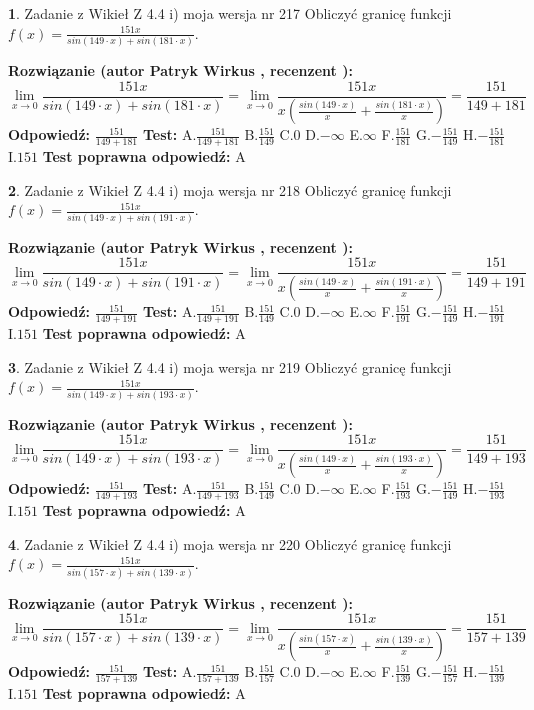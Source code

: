 \documentclass[12pt, a4paper]{article}
\theoremstyle{definition} %
\newtheorem{zad}{}
\newcommand{\zadStart}[1]{\begin{zad}#1\newline}
\newcommand{\zadStop}{\end{zad}}
\newcommand{\rozwStart}[2]{\noindent \textbf{Rozwiązanie (autor #1 , recenzent #2): }\newline}
\newcommand{\rozwStop}{\newline}
\newcommand{\odpStart}{\noindent \textbf{Odpowiedź:}\newline}
\newcommand{\odpStop}{\newline}
\newcommand{\testStart}{\noindent \textbf{Test:}\newline}
\newcommand{\testStop}{\newline}
\newcommand{\kluczStart}{\noindent \textbf{Test poprawna odpowiedź:}\newline}
\newcommand{\kluczStop}{\newline}
\begin{document}
\zadStart{Zadanie z Wikieł Z 4.4 i) moja wersja nr 217}
Obliczyć granicę funkcji $f(x)=\frac{151x}{sin(149\cdot x) +sin(181\cdot x)}$.
\zadStop
\rozwStart{Patryk Wirkus}{}
$$\lim\limits_{x\to 0}\frac{151x}{sin(149\cdot x) +sin(181\cdot x)}=\lim\limits_{x\to 0}\frac{151x}{x(\frac{sin(149\cdot x)}{x}+\frac{sin(181\cdot x)}{x})}=\frac{151}{149+181}$$
\rozwStop
\odpStart
$\frac{151}{149+181}$
\odpStop
\testStart
A.$\frac{151}{149+181}$
B.$\frac{151}{149}$
C.$0$
D.$-\infty$
E.$\infty$
F.$\frac{151}{181}$
G.$-\frac{151}{149}$
H.$-\frac{151}{181}$
I.$151$
\testStop
\kluczStart
A
\kluczStop



\zadStart{Zadanie z Wikieł Z 4.4 i) moja wersja nr 218}
Obliczyć granicę funkcji $f(x)=\frac{151x}{sin(149\cdot x) +sin(191\cdot x)}$.
\zadStop
\rozwStart{Patryk Wirkus}{}
$$\lim\limits_{x\to 0}\frac{151x}{sin(149\cdot x) +sin(191\cdot x)}=\lim\limits_{x\to 0}\frac{151x}{x(\frac{sin(149\cdot x)}{x}+\frac{sin(191\cdot x)}{x})}=\frac{151}{149+191}$$
\rozwStop
\odpStart
$\frac{151}{149+191}$
\odpStop
\testStart
A.$\frac{151}{149+191}$
B.$\frac{151}{149}$
C.$0$
D.$-\infty$
E.$\infty$
F.$\frac{151}{191}$
G.$-\frac{151}{149}$
H.$-\frac{151}{191}$
I.$151$
\testStop
\kluczStart
A
\kluczStop



\zadStart{Zadanie z Wikieł Z 4.4 i) moja wersja nr 219}
Obliczyć granicę funkcji $f(x)=\frac{151x}{sin(149\cdot x) +sin(193\cdot x)}$.
\zadStop
\rozwStart{Patryk Wirkus}{}
$$\lim\limits_{x\to 0}\frac{151x}{sin(149\cdot x) +sin(193\cdot x)}=\lim\limits_{x\to 0}\frac{151x}{x(\frac{sin(149\cdot x)}{x}+\frac{sin(193\cdot x)}{x})}=\frac{151}{149+193}$$
\rozwStop
\odpStart
$\frac{151}{149+193}$
\odpStop
\testStart
A.$\frac{151}{149+193}$
B.$\frac{151}{149}$
C.$0$
D.$-\infty$
E.$\infty$
F.$\frac{151}{193}$
G.$-\frac{151}{149}$
H.$-\frac{151}{193}$
I.$151$
\testStop
\kluczStart
A
\kluczStop



\zadStart{Zadanie z Wikieł Z 4.4 i) moja wersja nr 220}
Obliczyć granicę funkcji $f(x)=\frac{151x}{sin(157\cdot x) +sin(139\cdot x)}$.
\zadStop
\rozwStart{Patryk Wirkus}{}
$$\lim\limits_{x\to 0}\frac{151x}{sin(157\cdot x) +sin(139\cdot x)}=\lim\limits_{x\to 0}\frac{151x}{x(\frac{sin(157\cdot x)}{x}+\frac{sin(139\cdot x)}{x})}=\frac{151}{157+139}$$
\rozwStop
\odpStart
$\frac{151}{157+139}$
\odpStop
\testStart
A.$\frac{151}{157+139}$
B.$\frac{151}{157}$
C.$0$
D.$-\infty$
E.$\infty$
F.$\frac{151}{139}$
G.$-\frac{151}{157}$
H.$-\frac{151}{139}$
I.$151$
\testStop
\kluczStart
A
\kluczStop
\end{document}
